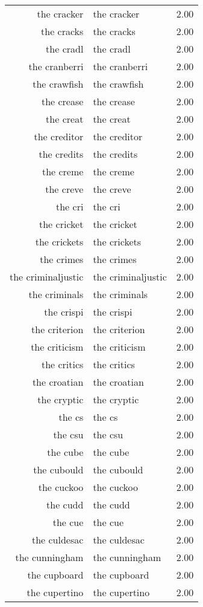 \begin{table}[ht]
\begin{tabular}{rlr}
  the cracker & the cracker & 2.00 \\ 
  the cracks & the cracks & 2.00 \\ 
  the cradl & the cradl & 2.00 \\ 
  the cranberri & the cranberri & 2.00 \\ 
  the crawfish & the crawfish & 2.00 \\ 
  the crease & the crease & 2.00 \\ 
  the creat & the creat & 2.00 \\ 
  the creditor & the creditor & 2.00 \\ 
  the credits & the credits & 2.00 \\ 
  the creme & the creme & 2.00 \\ 
  the creve & the creve & 2.00 \\ 
  the cri & the cri & 2.00 \\ 
  the cricket & the cricket & 2.00 \\ 
  the crickets & the crickets & 2.00 \\ 
  the crimes & the crimes & 2.00 \\ 
  the criminaljustic & the criminaljustic & 2.00 \\ 
  the criminals & the criminals & 2.00 \\ 
  the crispi & the crispi & 2.00 \\ 
  the criterion & the criterion & 2.00 \\ 
  the criticism & the criticism & 2.00 \\ 
  the critics & the critics & 2.00 \\ 
  the croatian & the croatian & 2.00 \\ 
  the cryptic & the cryptic & 2.00 \\ 
  the cs & the cs & 2.00 \\ 
  the csu & the csu & 2.00 \\ 
  the cube & the cube & 2.00 \\ 
  the cubould & the cubould & 2.00 \\ 
  the cuckoo & the cuckoo & 2.00 \\ 
  the cudd & the cudd & 2.00 \\ 
  the cue & the cue & 2.00 \\ 
  the culdesac & the culdesac & 2.00 \\ 
  the cunningham & the cunningham & 2.00 \\ 
  the cupboard & the cupboard & 2.00 \\ 
  the cupertino & the cupertino & 2.00 \\ 

\end{tabular}
\end{table}
